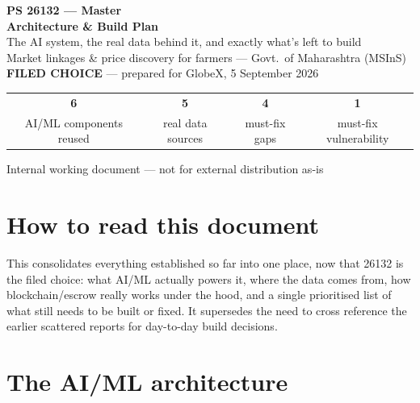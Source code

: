 \documentclass[11pt]{article}
\begin{document}
\begin{titlepage}
\centering
\vspace*{1.6cm}
{\Huge\bfseries\color{gxteal} PS 26132 --- Master}\\[0.4em]
{\Huge\bfseries\color{gxteal} Architecture \& Build Plan}\\[1.8em]
{\Large\color{gxslate} The AI system, the real data behind it, and exactly what's left to build}\\[3em]
{\normalsize\color{gxslate} Market linkages \& price discovery for farmers --- Govt.\ of Maharashtra (MSInS)}\\[0.3em]
{\normalsize\color{gxslate} \textbf{FILED CHOICE} --- prepared for GlobeX, 5 September 2026}\\[2.6em]
\begin{tabular}{cccc}
\textbf{\color{gxteal}\Large 6} & \textbf{\color{gxcyan}\Large 5} & \textbf{\color{gxamber}\Large 4} & \textbf{\color{gxred}\Large 1} \\
{\small AI/ML components reused} & {\small real data sources} & {\small must-fix gaps} & {\small must-fix vulnerability} \\
\end{tabular}
\vfill
{\footnotesize\color{gxslate} Internal working document --- not for external distribution as-is}
\end{titlepage}

\section*{How to read this document}
This consolidates everything established so far into one place, now that 26132 is the filed choice: what
AI/ML actually powers it, where the data comes from, how blockchain/escrow really works under the hood,
and a single prioritised list of what still needs to be built or fixed. It supersedes the need to cross
reference the earlier scattered reports for day-to-day build decisions.

\clearpage
\section{The AI/ML architecture}
\end{document}
